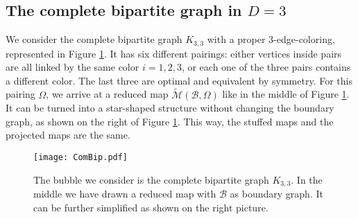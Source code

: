\documentclass[aps,prd,10pt,notitlepage,nofootinbib,superscriptaddress,showkeys,showpacs]{revtex4-1}
\begin{document}
\subsection{The complete bipartite graph in $D=3$} \label{sec:K33}

We consider the complete bipartite graph $K_{3,3}$ with a proper 3-edge-coloring, represented in Figure \ref{fig:CompBip}. It has six different pairings: either vertices inside pairs are all linked by the same color $i=1, 2, 3$, or each one of the three pairs contains a different color. The last three are optimal and equivalent by symmetry. For this pairing $\Omega$, we arrive at a reduced map $\tilde{\mathcal{M}}({\mathcal{B}}, \Omega)$ like in the middle of Figure \ref{fig:CompBip}. It can be turned into a star-shaped structure without changing the boundary graph, as shown on the right of Figure \ref{fig:CompBip}. This way, the stuffed maps and the projected maps are the same. 

\begin{figure}
\texttt{[image: ComBip.pdf]} 
\caption{\label{fig:CompBip} The bubble we consider is the complete bipartite graph $K_{3,3}$. In the middle we have drawn a reduced map with ${\mathcal{B}}$ as boundary graph. It can be further simplified as shown on the right picture.}
\end{figure}
\end{document}
